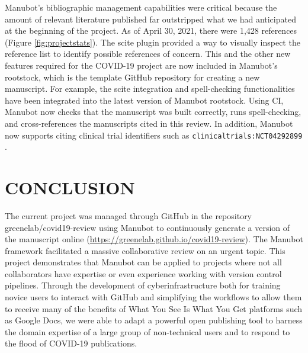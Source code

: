 \documentclass[twocolumn]{ceurart}
\begin{document}
Manubot's bibliographic management capabilities were critical because the amount of relevant literature published far outstripped what we had anticipated at the beginning of the project.
As of April 30, 2021, there were 1,428 references (Figure \ref{fig:projectstats}).
The scite plugin provided a way to visually inspect the reference list to identify possible references of concern.
This and the other new features required for the COVID-19 project are now included in Manubot's rootstock, which is the template GitHub repository for creating a new manuscript.
For example, the scite integration and spell-checking functionalities have been integrated into the latest version of Manubot rootstock.
Using CI, Manubot now checks that the manuscript was built correctly, runs spell-checking, and cross-references the manuscripts cited in this review.
In addition, Manubot now supports citing clinical trial identifiers such as \texttt{clinicaltrials:NCT04292899} \citep{yTCAmOyt}.

\hypertarget{conclusion}{%
\section{CONCLUSION}\label{conclusion}}

The current project was managed through GitHub in the repository greenelab/covid19-review using Manubot \citep{YuJbg3zO} to continuously generate a version of the manuscript online (\url{https://greenelab.github.io/covid19-review}).
The Manubot framework facilitated a massive collaborative review on an urgent topic.
This project demonstrates that Manubot can be applied to projects where not all collaborators have expertise or even experience working with version control pipelines.
Through the development of cyberinfrastructure both for training novice users to interact with GitHub and simplifying the workflows to allow them to receive many of the benefits of What You See Is What You Get platforms such as Google Docs, we were able to adapt a powerful open publishing tool to harness the domain expertise of a large group of non-technical users and to respond to the flood of COVID-19 publications.
\end{document}
